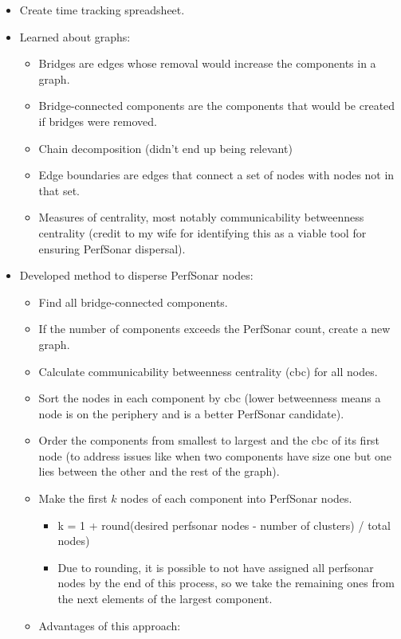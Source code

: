 \documentclass{weeklyreport}
\begin{document}
\begin{itemize}
    \item Create time tracking spreadsheet.
    \item Learned about graphs:
    \begin{itemize}
    	\item Bridges are edges whose removal would increase the components in a graph.
    	\item Bridge-connected components are the components that would be created if bridges were removed.
    	\item Chain decomposition (didn't end up being relevant)
    	\item Edge boundaries are edges that connect a set of nodes with nodes not in that set.
    	\item Measures of centrality, most notably communicability betweenness centrality (credit to my wife for identifying this as a viable tool for ensuring PerfSonar dispersal).
    \end{itemize}
    \item Developed method to disperse PerfSonar nodes:
    \begin{itemize}
    	\item Find all bridge-connected components.
    	\item If the number of components exceeds the PerfSonar count, create a new graph.
    	\item Calculate communicability betweenness centrality (cbc) for all nodes.
    	\item Sort the nodes in each component by cbc (lower betweenness means a node is on the periphery and is a better PerfSonar candidate).
    	\item Order the components from smallest to largest and the cbc of its first node (to address issues like when two components have size one but one lies between the other and the rest of the graph).
    	\item Make the first $k$ nodes of each component into PerfSonar nodes. 
    	\begin{itemize}
    		\item k = 1 + round(desired perfsonar nodes - number of clusters) / total nodes) 
			\item Due to rounding, it is possible to not have assigned all perfsonar nodes by the end of this process, so we take the remaining ones from the next elements of the largest component.	
    	\end{itemize}
		\item Advantages of this approach:

\end{itemize}
\end{itemize}
\end{document}
